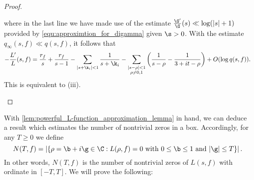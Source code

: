 \begin{proof}
\begin{enumerate}[label=(\roman*)]
\[        \]
        where in the last line we have made use of the estimate $\frac{\G'}{\G}(s) \ll \log(|s|+1)$ provided by \cref{equ:approximtion_for_digamma} given $\s > 0$. With the estimate $q_{\infty}(s,f) \ll q(s,f)$, it follows that
        \[
          -\frac{L'}{L}(s,f) = \frac{r_{f}}{s}+\frac{r_{f}}{s-1}-\sum_{|s+\k_{i}| < 1}\frac{1}{s+\k_{i}}-\sum_{\substack{|s-\rho| < 1 \\ \rho \neq 0,1}}\left(\frac{1}{s-\rho}-\frac{1}{3+it-\rho}\right)+O(\log{q(s,f)}).
        \]
        This is equivalent to (iii).
      \end{enumerate}
    \end{proof}

    With \cref{lem:powerful_L-function_approximation_lemma} in hand, we can deduce a result which estimates the number of nontrivial zeros in a box. Accordingly, for any $T \ge 0$ we define
    \[
      N(T,f) = \left|\{\rho = \b+i\g \in \C:L(\rho,f) = 0 \text{ with } 0 \le \b \le 1 \text{ and } |\g| \le T\}\right|.
    \]
    In other words, $N(T,f)$ is the number of nontrivial zeros of $L(s,f)$ with ordinate in $[-T,T]$. We will prove the following:

